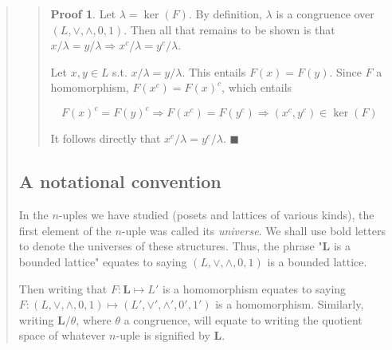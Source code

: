 \documentclass[a4paper, 12pt]{article}
\theoremstyle{definition}
\theoremstyle{definition}
\theoremstyle{definition}
\newtheorem{pro}{Proof}
\DeclareMathOperator{\ker}{ker}
\begin{document}
\begin{quote}
\begin{quote}
\begin{pro}



    Let $\lambda = \ker(F)$. By definition, $\lambda$ is a congruence over $(L,
    \lor, \land, 0, 1)$. Then all that remains to be shown is that $x / \lambda
    = y / \lambda \Rightarrow x^c / \lambda = y^c / \lambda$.

    Let $x, y \in L$ s.t. $x / \lambda = y / \lambda$. This entails 
    $F(x) = F(y)$. Since $F$ a homomorphism, 
    $F(x^c) = F(x)^c$, which entails 

    \begin{equation*}
        F(x)^c = F(y)^c \Rightarrow F(x^c) = F(y^c) \Rightarrow (x^c, y^c) \in \ker(F)
    \end{equation*}

    It follows directly that $x^c / \lambda = y^c / \lambda$. $\blacksquare$



\end{pro}

\end{quote}
\normalsize

\subsection{A notational convention}

In the $n$-uples we have studied (posets and lattices of various kinds), the
first element of the $n$-uple was called its \textit{universe}. We shall use
bold letters to denote the universes of these structures. Thus, the phrase
"\textbf{L} is a bounded lattice" equates to saying $(L, \lor, \land, 0, 1)$ is
a bounded lattice.

Then writing that $F : \textbf{L} \mapsto L'$ is a homomorphism equates to
saying $F : (L, \lor, \land, 0, 1) \mapsto (L', \lor', \land', 0', 1')$ is a
homomorphism. Similarly, writing $\textbf{L} / \theta$, where $\theta$ a
congruence, will equate to writing the quotient space of whatever $n$-uple is
signified by \textbf{L}.

\pagebreak 


\end{quote}
\end{document}
